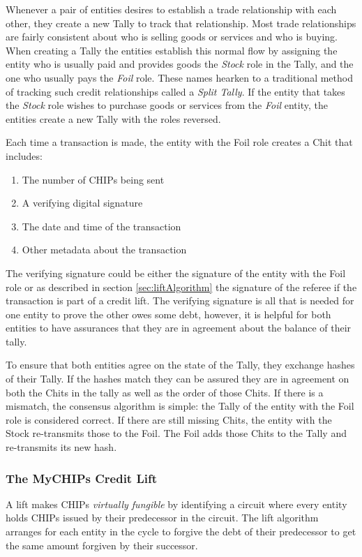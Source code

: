 \documentclass[runningheads]{llncs}
\begin{document}
Whenever a pair of entities desires to establish a trade relationship with each other, they create a new Tally to track that relationship. Most trade relationships are fairly consistent about who is selling goods or services and who is buying. When creating a Tally the entities establish this normal flow by assigning the entity who is usually paid and provides goods the \emph{Stock} role in the Tally, and the one who usually pays the \emph{Foil} role. These names hearken to a traditional method of tracking such credit relationships called a \emph{Split Tally}. If the entity that takes the \emph{Stock} role wishes to purchase goods or services from the \emph{Foil} entity, the entities create a new Tally with the roles reversed.

Each time a transaction is made, the entity with the Foil role creates a Chit that includes: 
\begin{enumerate}
    \item The number of CHIPs being sent
    \item A verifying digital signature
    \item The date and time of the transaction
    \item Other metadata about the transaction
\end{enumerate}
The verifying signature could be either the signature of the entity with the Foil role or as described in section \ref{sec:liftAlgorithm} the signature of the referee if the transaction is part of a credit lift. The verifying signature is all that is needed for one entity to prove the other owes some debt, however, it is helpful for both entities to have assurances that they are in agreement about the balance of their tally. 

To ensure that both entities agree on the state of the Tally, they exchange hashes of their Tally. If the hashes match they can be assured they are in agreement on both the Chits in the tally as well as the order of those Chits. If there is a mismatch, the consensus algorithm is simple: the Tally of the entity with the Foil role is considered correct. If there are still missing Chits, the entity with the Stock re-transmits those to the Foil. The Foil adds those Chits to the Tally and re-transmits its new hash. 

\subsubsection{The MyCHIPs Credit Lift}
A lift makes CHIPs \emph{virtually fungible} by identifying a circuit where every entity holds CHIPs issued by their predecessor in the circuit. The lift algorithm arranges for each entity in the cycle to forgive the debt of their predecessor to get the same amount forgiven by their successor. 
 
\end{document}
